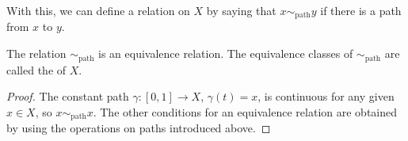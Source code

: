 With this, we can define a relation on $X$ by saying that $x \sim_{\mathrm{path}} y$ if there is a path from $x$ to $y$.
\begin{lem}
  The relation $\sim_{\mathrm{path}}$ is an equivalence relation. The equivalence classes of $\sim_{\mathrm{path}}$ are called the  of $X$.
\end{lem}
\begin{proof}
  The constant path $\gamma:[0,1]\to X$, $\gamma(t) = x$, is continuous for any given $x \in X$, so $x \sim_{\mathrm{path}} x$. The other conditions for an equivalence relation are obtained by using the operations on paths introduced above.
\end{proof}

